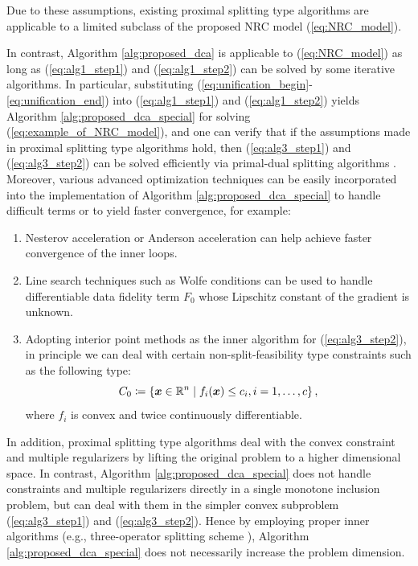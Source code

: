 \documentclass[lettersize,journal]{IEEEtran}
\theoremstyle{plain}%
\theoremstyle{definition}
\theoremstyle{remark}
\begin{document}
Due to these assumptions, existing proximal splitting type algorithms \cite{selesnick2017,abe2020,alshabili2021,yata2021} are applicable to a limited subclass of the proposed NRC model (\ref{eq:NRC_model}). 

 

In contrast, Algorithm \ref{alg:proposed_dca} is applicable to (\ref{eq:NRC_model}) as long as (\ref{eq:alg1_step1}) and (\ref{eq:alg1_step2}) can be solved by some iterative algorithms. In particular, substituting (\ref{eq:unification_begin}-\ref{eq:unification_end}) into (\ref{eq:alg1_step1}) and (\ref{eq:alg1_step2}) yields Algorithm \ref{alg:proposed_dca_special} for solving (\ref{eq:example_of_NRC_model}), and one can verify that if the assumptions made in proximal splitting type algorithms hold, then (\ref{eq:alg3_step1}) and (\ref{eq:alg3_step2}) can be solved efficiently via primal-dual splitting algorithms \cite{combettes2012,condat2013}. Moreover, various advanced optimization techniques can be easily incorporated into the implementation of Algorithm \ref{alg:proposed_dca_special} to handle difficult terms or to yield faster convergence, for example:
\begin{enumerate}
\item Nesterov acceleration \cite{nesterov1983} or Anderson acceleration \cite{walker2011} can help achieve faster convergence of the inner loops.

\item Line search techniques such as Wolfe conditions \cite{nocedal2006} can be used to handle differentiable data fidelity term $F_0$ whose Lipschitz constant of the gradient is unknown.

\item Adopting interior point methods \cite[Ch. 11]{boyd2004} as the inner algorithm for (\ref{eq:alg3_step2}), in principle we can deal with certain non-split-feasibility type constraints such as the following type:
\begin{equation*}
C_0\coloneqq \left\{ \bm{x}\in\mathbb{R}^n\mid f_i(\bm{x})\leq c_i, i=1,\dots, c \right\},
\end{equation*}
where $f_i$ is convex and twice continuously differentiable.
\end{enumerate}

In addition, proximal splitting type algorithms \cite{abe2020,yata2021} deal with the convex constraint and multiple regularizers by lifting the original problem to a higher dimensional space. In contrast, Algorithm \ref{alg:proposed_dca_special} does not handle constraints and multiple regularizers directly in a single monotone inclusion problem, but can deal with them in the simpler convex subproblem (\ref{eq:alg3_step1}) and (\ref{eq:alg3_step2}). Hence by employing proper inner algorithms (e.g., three-operator splitting scheme \cite{davis2017}), Algorithm \ref{alg:proposed_dca_special} does not necessarily increase the problem dimension.
\end{document}
